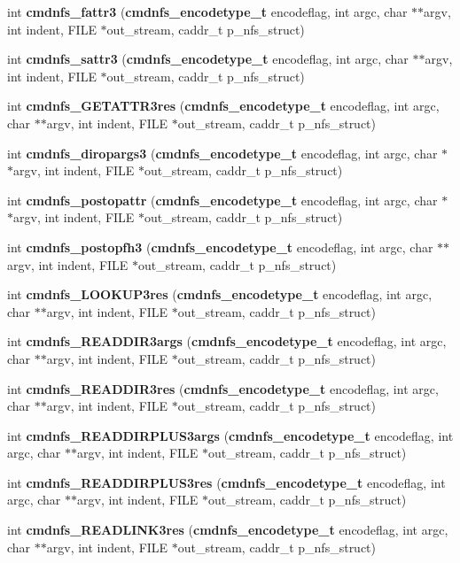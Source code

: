 \begin{CompactItemize}
\item 
int {\bf cmdnfs\_\-fattr3} ({\bf cmdnfs\_\-encodetype\_\-t} encodeflag, int argc, char $\ast$$\ast$argv, int indent, FILE $\ast$out\_\-stream, caddr\_\-t p\_\-nfs\_\-struct)
\item 
int {\bf cmdnfs\_\-sattr3} ({\bf cmdnfs\_\-encodetype\_\-t} encodeflag, int argc, char $\ast$$\ast$argv, int indent, FILE $\ast$out\_\-stream, caddr\_\-t p\_\-nfs\_\-struct)
\item 
int {\bf cmdnfs\_\-GETATTR3res} ({\bf cmdnfs\_\-encodetype\_\-t} encodeflag, int argc, char $\ast$$\ast$argv, int indent, FILE $\ast$out\_\-stream, caddr\_\-t p\_\-nfs\_\-struct)
\item 
int {\bf cmdnfs\_\-diropargs3} ({\bf cmdnfs\_\-encodetype\_\-t} encodeflag, int argc, char $\ast$$\ast$argv, int indent, FILE $\ast$out\_\-stream, caddr\_\-t p\_\-nfs\_\-struct)
\item 
int {\bf cmdnfs\_\-postopattr} ({\bf cmdnfs\_\-encodetype\_\-t} encodeflag, int argc, char $\ast$$\ast$argv, int indent, FILE $\ast$out\_\-stream, caddr\_\-t p\_\-nfs\_\-struct)
\item 
int {\bf cmdnfs\_\-postopfh3} ({\bf cmdnfs\_\-encodetype\_\-t} encodeflag, int argc, char $\ast$$\ast$argv, int indent, FILE $\ast$out\_\-stream, caddr\_\-t p\_\-nfs\_\-struct)
\item 
int {\bf cmdnfs\_\-LOOKUP3res} ({\bf cmdnfs\_\-encodetype\_\-t} encodeflag, int argc, char $\ast$$\ast$argv, int indent, FILE $\ast$out\_\-stream, caddr\_\-t p\_\-nfs\_\-struct)
\item 
int {\bf cmdnfs\_\-READDIR3args} ({\bf cmdnfs\_\-encodetype\_\-t} encodeflag, int argc, char $\ast$$\ast$argv, int indent, FILE $\ast$out\_\-stream, caddr\_\-t p\_\-nfs\_\-struct)
\item 
int {\bf cmdnfs\_\-READDIR3res} ({\bf cmdnfs\_\-encodetype\_\-t} encodeflag, int argc, char $\ast$$\ast$argv, int indent, FILE $\ast$out\_\-stream, caddr\_\-t p\_\-nfs\_\-struct)
\item 
int {\bf cmdnfs\_\-READDIRPLUS3args} ({\bf cmdnfs\_\-encodetype\_\-t} encodeflag, int argc, char $\ast$$\ast$argv, int indent, FILE $\ast$out\_\-stream, caddr\_\-t p\_\-nfs\_\-struct)
\item 
int {\bf cmdnfs\_\-READDIRPLUS3res} ({\bf cmdnfs\_\-encodetype\_\-t} encodeflag, int argc, char $\ast$$\ast$argv, int indent, FILE $\ast$out\_\-stream, caddr\_\-t p\_\-nfs\_\-struct)
\item 
int {\bf cmdnfs\_\-READLINK3res} ({\bf cmdnfs\_\-encodetype\_\-t} encodeflag, int argc, char $\ast$$\ast$argv, int indent, FILE $\ast$out\_\-stream, caddr\_\-t p\_\-nfs\_\-struct)

\end{CompactItemize}
